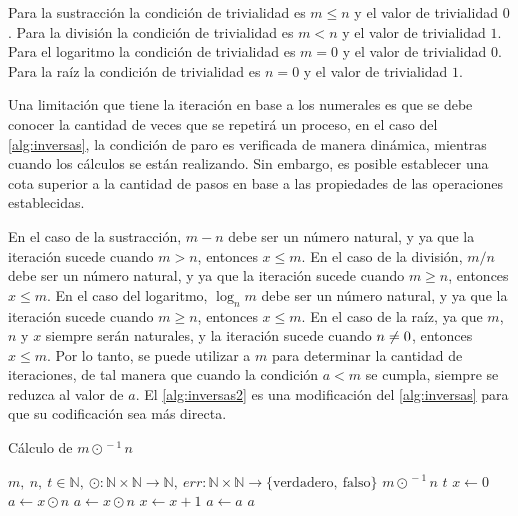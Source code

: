 Para la sustracción la condición de trivialidad es $ m \leq n $ y el valor de trivialidad $ 0 $. Para la división la condición de trivialidad es $ m < n $ y el valor de trivialidad $ 1 $. Para el logaritmo la condición de trivialidad es $ m=0 $ y el valor de trivialidad $ 0 $. Para la raíz la condición de trivialidad es $ n=0 $ y el valor de trivialidad $ 1 $.

Una limitación que tiene la iteración en base a los numerales es que se debe conocer la cantidad de veces que se repetirá un proceso, en el caso del \autoref{alg:inversas}, la condición de paro es verificada de manera dinámica, mientras cuando los cálculos se están realizando. Sin embargo, es posible establecer una cota superior a la cantidad de pasos en base a las propiedades de las operaciones establecidas.

En el caso de la sustracción, $ m-n $ debe ser un número natural, y ya que la iteración sucede cuando $ m>n $, entonces $ x\leq m $. En el caso de la división, $ m/n $ debe ser un número natural, y ya que la iteración sucede cuando $ m\geq n $, entonces $ x\leq m $. En el caso del logaritmo, $ \log_{n}m $ debe ser un número natural, y ya que la iteración sucede cuando $ m\geq n $, entonces $ x\leq m $. En el caso de la raíz, ya que $ m $, $ n $ y $ x $ siempre serán naturales, y la iteración sucede cuando $ n \centernot= 0 $, entonces $ x\leq m $. Por lo tanto, se puede utilizar a $ m $ para determinar la cantidad de iteraciones, de tal manera que cuando la condición $ a < m $ se cumpla, siempre se reduzca al valor de $ a $. El \autoref{alg:inversas2} es una modificación del \autoref{alg:inversas} para que su codificación sea más directa.

\begin{algorithm}
  \caption{Cálculo de $ m \odot^{\, -1} n $}
  \label{alg:inversas2}
  \begin{algorithmic}
    \REQUIRE $ m,\ n,\ t \in \mathbb{N},\ \odot \colon \mathbb{N} \times \mathbb{N} \to \mathbb{N},\ err \colon \mathbb{N} \times \mathbb{N} \to \{ \mathrm{verdadero},\ \mathrm{falso} \} $
    \ENSURE $ m \odot^{\, -1} n $
    \RETURN $ t $
    \ELSE
    \STATE $ x \leftarrow 0 $
    \STATE $ a \leftarrow x \odot n $
    \STATE $ a \leftarrow x \odot n $
    \STATE $ x \leftarrow x + 1 $
    \ELSE
    \STATE $ a \leftarrow a $
    \ENDIF
    \ENDFOR
    \RETURN $ a $
    \ENDIF
  \end{algorithmic}
\end{algorithm}


